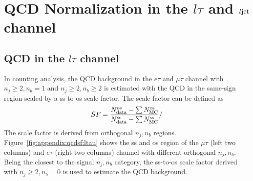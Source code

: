 \section{QCD Normalization in the $l\tau$ and $l\rm{jet}$ channel}

\subsection{QCD in the $l\tau$ channel }
In counting analysis, the QCD background in the $e\tau$ and $\mu\tau$ channel with $n_j\geq 2,n_b=1$ and
$n_j\geq 2,n_b\geq2$ is estimated with the QCD in the same-sign region scaled by a ss-to-os scale factor.
The scale factor can be defined as
\begin{equation}
    SF = \frac{N^{\rm{os}}_{\rm{data}} - \sum N^{\rm{os}}_{\rm{MC}} } {N^{\rm{ss}}_{\rm{data}} - \sum N^{\rm{ss}}_{\rm{MC}} }/
\end{equation}
\noindent The scale factor is derived from orthogonal $n_j,n_b$ regions.
Figure~\ref{fig:appendix:qcdsf:ltau} shows the ss and os region of the $\mu\tau$ (left two columns) and 
$e\tau$ (right two columns) channel with different orthogonal $n_j,n_b$. Being the closest to the signal
$n_j,n_b$ category, the ss-to-os scale factor derived with $n_j\geq2,n_b=0$ is used to estimate the QCD 
background.


